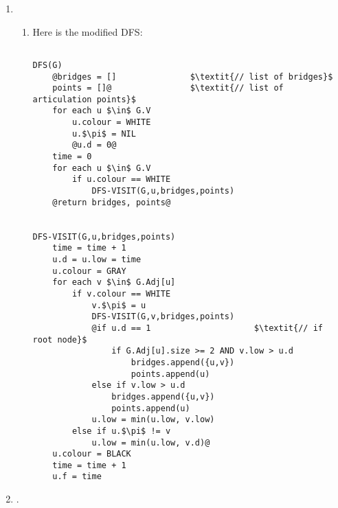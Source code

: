 \documentclass[11pt,twoside]{article}
\begin{document}
\begin{enumerate}
\newpage
\item
\begin{enumerate}

\item Here is the modified DFS:
\begin{lstlisting}[mathescape,frame=single,style=base]

DFS(G)
    @bridges = []               $\textit{// list of bridges}$
    points = []@                $\textit{// list of articulation points}$
    for each u $\in$ G.V
        u.colour = WHITE
        u.$\pi$ = NIL
        @u.d = 0@
    time = 0
    for each u $\in$ G.V
        if u.colour == WHITE
            DFS-VISIT(G,u,bridges,points)
    @return bridges, points@


DFS-VISIT(G,u,bridges,points)
    time = time + 1
    u.d = u.low = time
    u.colour = GRAY
    for each v $\in$ G.Adj[u]
        if v.colour == WHITE
            v.$\pi$ = u
            DFS-VISIT(G,v,bridges,points)
            @if u.d == 1                     $\textit{// if root node}$
                if G.Adj[u].size >= 2 AND v.low > u.d
                    bridges.append({u,v})
                    points.append(u)
            else if v.low > u.d
                bridges.append({u,v})
                points.append(u)
            u.low = min(u.low, v.low)
        else if u.$\pi$ != v
            u.low = min(u.low, v.d)@
    u.colour = BLACK
    time = time + 1
    u.f = time
\end{lstlisting}

\newpage
\end{enumerate}



\item .\\

\end{enumerate}
\end{document}

